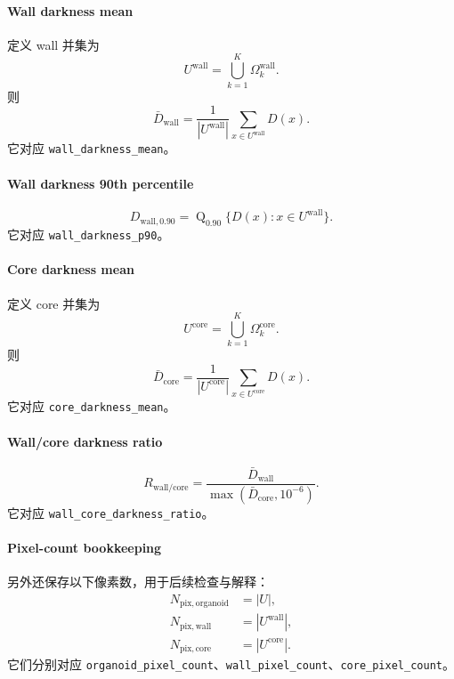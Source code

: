 \documentclass[11pt]{article}
\newcommand{\1}{\mathbf{1}}
\newcommand{\quantile}{\operatorname{Q}}
\newcommand{\unionmask}{U}
\begin{document}
\paragraph{Wall darkness mean}
定义 wall 并集为
\begin{equation}
\unionmask^{\mathrm{wall}} = \bigcup_{k=1}^{K} \Omega_k^{\mathrm{wall}}.
\end{equation}
则
\begin{equation}
\bar{D}_{\mathrm{wall}} = \frac{1}{|\unionmask^{\mathrm{wall}}|}\sum_{x\in\unionmask^{\mathrm{wall}}} D(x).
\end{equation}
它对应 \texttt{wall\_darkness\_mean}。

\paragraph{Wall darkness 90th percentile}
\begin{equation}
D_{\mathrm{wall},0.90} = \quantile_{0.90}\{D(x): x\in\unionmask^{\mathrm{wall}}\}.
\end{equation}
它对应 \texttt{wall\_darkness\_p90}。

\paragraph{Core darkness mean}
定义 core 并集为
\begin{equation}
\unionmask^{\mathrm{core}} = \bigcup_{k=1}^{K} \Omega_k^{\mathrm{core}}.
\end{equation}
则
\begin{equation}
\bar{D}_{\mathrm{core}} = \frac{1}{|\unionmask^{\mathrm{core}}|}\sum_{x\in\unionmask^{\mathrm{core}}} D(x).
\end{equation}
它对应 \texttt{core\_darkness\_mean}。

\paragraph{Wall/core darkness ratio}
\begin{equation}
R_{\mathrm{wall/core}} = \frac{\bar{D}_{\mathrm{wall}}}{\max(\bar{D}_{\mathrm{core}}, 10^{-6})}.
\end{equation}
它对应 \texttt{wall\_core\_darkness\_ratio}。

\paragraph{Pixel-count bookkeeping}
另外还保存以下像素数，用于后续检查与解释：
\begin{align}
N_{\mathrm{pix,organoid}} &= |\unionmask|,\\
N_{\mathrm{pix,wall}} &= |\unionmask^{\mathrm{wall}}|,\\
N_{\mathrm{pix,core}} &= |\unionmask^{\mathrm{core}}|.
\end{align}
它们分别对应 \texttt{organoid\_pixel\_count}、\texttt{wall\_pixel\_count}、\texttt{core\_pixel\_count}。
\end{document}
